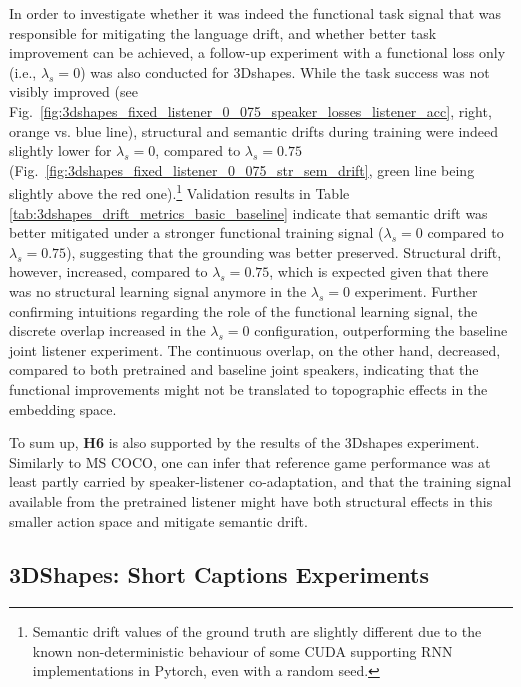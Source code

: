 In order to investigate whether it was indeed the functional task signal that was responsible for mitigating the language drift, and whether better task improvement can be achieved, a follow-up experiment with a functional loss only (i.e., $\lambda_s=0$) was also conducted for 3Dshapes. While the task success was not visibly improved (see Fig.~\ref{fig:3dshapes_fixed_listener_0_075_speaker_losses_listener_acc}, right, orange vs. blue line), structural and semantic drifts during training were indeed slightly lower for $\lambda_s=0$, compared to $\lambda_s=0.75$ (Fig.~\ref{fig:3dshapes_fixed_listener_0_075_str_sem_drift}, green line being slightly above the red one).\footnote{Semantic drift values of the ground truth are slightly different due to the known non-deterministic behaviour of some CUDA supporting RNN implementations in Pytorch, even with a random seed.} Validation results in Table \ref{tab:3dshapes_drift_metrics_basic_baseline} indicate that semantic drift was better mitigated under a stronger functional training signal ($\lambda_s =0$ compared to $\lambda_s =0.75$), suggesting that the grounding was better preserved. Structural drift, however, increased, compared to $\lambda_s =0.75$, which is expected given that there was no structural learning signal anymore in the $\lambda_s =0$ experiment. Further confirming intuitions regarding the role of the functional learning signal, the discrete overlap increased in the $\lambda_s =0$ configuration, outperforming the baseline joint listener experiment. The continuous overlap, on the other hand, decreased, compared to both pretrained and baseline joint speakers, indicating that the functional improvements might not be translated to topographic effects in the embedding space.

To sum up, \textbf{H6} is also supported by the results of the 3Dshapes experiment. Similarly to MS COCO, one can infer that reference game performance was at least partly carried by speaker-listener co-adaptation, and that the training signal available from the pretrained listener might have both structural effects in this smaller action space and mitigate semantic drift. 

\subsection{3DShapes: Short Captions Experiments}
\label{expt:3dshapes_short}

